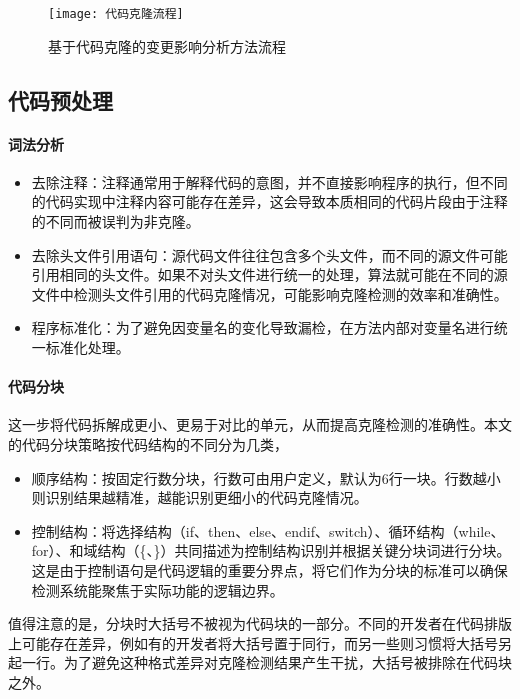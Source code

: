 \begin{figure}[h]
\centering
\texttt{[image: 代码克隆流程]}
\caption{基于代码克隆的变更影响分析方法流程}
\end{figure}

\subsection{代码预处理}

\paragraph{词法分析}

\begin{itemize}
    \item 去除注释：注释通常用于解释代码的意图，并不直接影响程序的执行，但不同的代码实现中注释内容可能存在差异，这会导致本质相同的代码片段由于注释的不同而被误判为非克隆。
    
    \item 去除头文件引用语句：源代码文件往往包含多个头文件，而不同的源文件可能引用相同的头文件。如果不对头文件进行统一的处理，算法就可能在不同的源文件中检测头文件引用的代码克隆情况，可能影响克隆检测的效率和准确性。
    
    \item 程序标准化：为了避免因变量名的变化导致漏检，在方法内部对变量名进行统一标准化处理。

\end{itemize}


\paragraph{代码分块} 这一步将代码拆解成更小、更易于对比的单元，从而提高克隆检测的准确性。本文的代码分块策略按代码结构的不同分为几类，

\begin{itemize}
    \item 顺序结构：按固定行数分块，行数可由用户定义，默认为6行一块。行数越小则识别结果越精准，越能识别更细小的代码克隆情况。
    
    \item 控制结构：将选择结构（if、then、else、endif、switch）、循环结构（while、for）、和域结构（\{、\}）共同描述为控制结构识别并根据关键分块词进行分块。这是由于控制语句是代码逻辑的重要分界点，将它们作为分块的标准可以确保检测系统能聚焦于实际功能的逻辑边界。
\end{itemize}

值得注意的是，分块时大括号不被视为代码块的一部分。不同的开发者在代码排版上可能存在差异，例如有的开发者将大括号置于同行，而另一些则习惯将大括号另起一行。为了避免这种格式差异对克隆检测结果产生干扰，大括号被排除在代码块之外。


